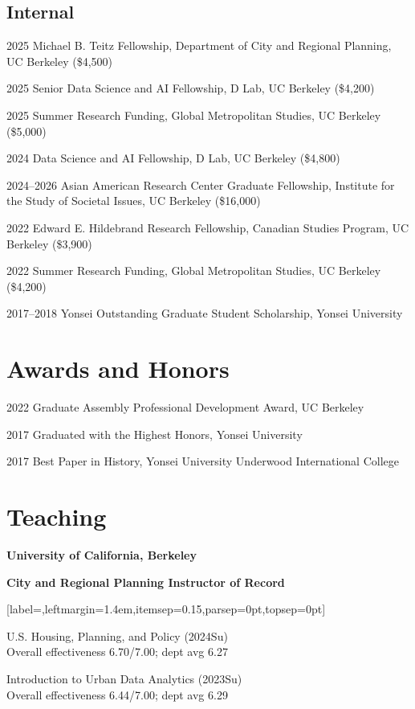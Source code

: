 \documentclass[11pt,letterpaper]{article}
\newcommand{\listitemspace}{0.25em}
\renewenvironment{itemize}
{\begin{list}{}{\setlength{\leftmargin}{1em}
\setlength{\parskip}{0pt}
\setlength{\itemsep}{\listitemspace}
\setlength{\parsep}{\listitemspace}}}
{\end{list}}
\newcommand{\money}[1]{(\$#1)}
\newcommand{\term}[1]{(#1)}
\newenvironment{subpoints}{%
  \begin{itemize}[label={},leftmargin=1.4em,itemsep=0.15\baselineskip,parsep=0pt,topsep=0pt]}%
  {\end{itemize}}
\newcommand{\institution}[1]{%
  \par\vspace{0.35\baselineskip}%
  {\sffamily\bfseries\fontsize{12.5}{14}\selectfont #1}\par
  \vspace{0.15\baselineskip}%
}
\newcommand{\role}[1]{{\sffamily\bfseries #1}\par\vspace{0.2\baselineskip}}
\begin{document}
\subsection{Internal}
\begin{tablist}
  \item[2025] \tab{}Michael B. Teitz Fellowship, Department of City and Regional Planning, UC Berkeley \money{4,500}
  \item[2025] \tab{}Senior Data Science and AI Fellowship, D Lab, UC Berkeley \money{4,200}
  \item[2025] \tab{}Summer Research Funding, Global Metropolitan Studies, UC Berkeley \money{5,000}
  \item[2024] \tab{}Data Science and AI Fellowship, D Lab, UC Berkeley \money{4,800}
  \item[2024–2026] \tab{}Asian American Research Center Graduate Fellowship, Institute for the Study of Societal Issues, UC Berkeley \money{16,000}
  \item[2022] \tab{}Edward E. Hildebrand Research Fellowship, Canadian Studies Program, UC Berkeley \money{3,900}
  \item[2022] \tab{}Summer Research Funding, Global Metropolitan Studies, UC Berkeley \money{4,200}
  \item[2017–2018] \tab{}Yonsei Outstanding Graduate Student Scholarship, Yonsei University
\end{tablist}

\section{Awards and Honors}
\begin{tablist}
  \item[2022] \tab{}Graduate Assembly Professional Development Award, UC Berkeley
  \item[2017] \tab{}Graduated with the Highest Honors, Yonsei University
  \item[2017] \tab{}Best Paper in History, Yonsei University Underwood International College
\end{tablist}

\section{Teaching}

\institution{University of California, Berkeley}
\role{City and Regional Planning  Instructor of Record}
\begin{subpoints}
  \item U.S. Housing, Planning, and Policy \term{2024Su}\\[-0.15em]
        {\footnotesize Overall effectiveness 6.70/7.00; dept avg 6.27}
  \item Introduction to Urban Data Analytics \term{2023Su}\\[-0.15em]
        {\footnotesize Overall effectiveness 6.44/7.00; dept avg 6.29}
\end{subpoints}
\end{document}

